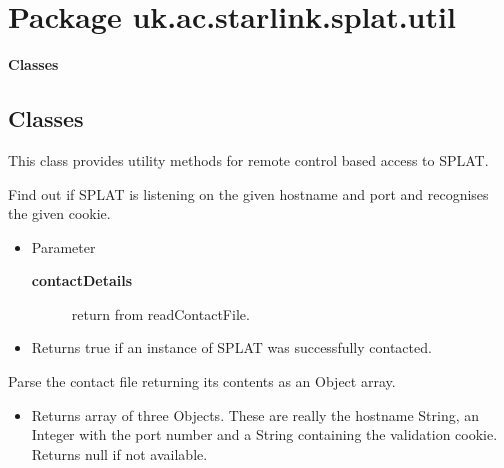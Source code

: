 \clearpage


\section{Package uk.ac.starlink.splat.util}

\vspace{.13in}
\hbox{\textbf{Classes}}
\vspace{.13in}
\clearpage
\subsection{Classes}




\vspace{.09in}


{This class provides utility methods for remote control based
 access to SPLAT.}
\methods
{}
\begin{desc}Find out if SPLAT is listening on the given hostname and port
 and recognises the given cookie.
\begin{itemize}
\item{Parameter
  \begin{description}
   \item[\textbf{contactDetails}]{return from readContactFile.}
  \end{description}}
\end{itemize}
\begin{itemize}
\item{Returns true if an instance of SPLAT was successfully contacted. }
\end{itemize}
\end{desc}

\begin{desc}Parse the contact file returning its contents as an Object array.
\begin{itemize}
\item{Returns array of three Objects. These are really the hostname
         String, an Integer with the port number and a String
         containing the validation cookie. Returns null if not
         available. }
\end{itemize}
\end{desc}


